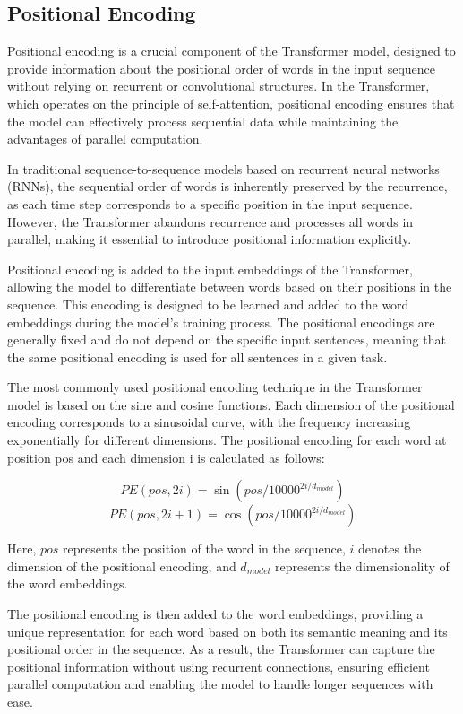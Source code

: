 \documentclass{article}
\begin{document}
\subsection{Positional Encoding}


Positional encoding is a crucial component of the Transformer model, designed to provide information about the positional order of words in the input sequence without relying on recurrent or convolutional structures. In the Transformer, which operates on the principle of self-attention, positional encoding ensures that the model can effectively process sequential data while maintaining the advantages of parallel computation.

In traditional sequence-to-sequence models based on recurrent neural networks (RNNs), the sequential order of words is inherently preserved by the recurrence, as each time step corresponds to a specific position in the input sequence. However, the Transformer abandons recurrence and processes all words in parallel, making it essential to introduce positional information explicitly.

Positional encoding is added to the input embeddings of the Transformer, allowing the model to differentiate between words based on their positions in the sequence. This encoding is designed to be learned and added to the word embeddings during the model's training process. The positional encodings are generally fixed and do not depend on the specific input sentences, meaning that the same positional encoding is used for all sentences in a given task.

The most commonly used positional encoding technique in the Transformer model is based on the sine and cosine functions. Each dimension of the positional encoding corresponds to a sinusoidal curve, with the frequency increasing exponentially for different dimensions. The positional encoding for each word at position pos and each dimension i is calculated as follows:

$$ PE(pos, 2i) = \sin(pos / 10000^{2i/d_{model}}) $$
$$ PE(pos, 2i+1) = \cos(pos / 10000^{2i/d_{model}}) $$

Here, $pos$ represents the position of the word in the sequence, $i$ denotes the dimension of the positional encoding, and $d_{model}$ represents the dimensionality of the word embeddings.

The positional encoding is then added to the word embeddings, providing a unique representation for each word based on both its semantic meaning and its positional order in the sequence. As a result, the Transformer can capture the positional information without using recurrent connections, ensuring efficient parallel computation and enabling the model to handle longer sequences with ease.
\end{document}
